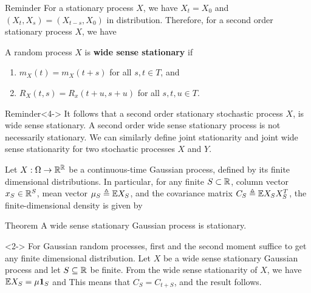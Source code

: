 \documentclass[12pt,aspectratio=169]{beamer}
\begin{document}
\begin{frame}
\begin{block}{Reminder}
For a stationary process $X$, we have $X_t = X_0$ and $(X_t,X_s) = (X_{t-s}, X_{0})$ in distribution. 
Therefore, for a second order stationary process $X$, we have 
\end{block}
\end{frame}

\begin{frame}
\begin{Definition}
A random process $X$ is \textbf{wide sense stationary} if 
\begin{enumerate}
\item<2-> $m_X(t) = m_X(t+s)$ for all $s,t \in T$, and 
\item<3-> $R_X(t,s) = R_x(t+u, s+u)$ for all $s,t,u \in T$. 
\end{enumerate} 
\end{Definition}
\begin{block}{Reminder}<4->
It follows that a second order stationary stochastic process $X$,  is wide sense stationary. 
A second order wide sense stationary process is not necessarily stationary. 
We can similarly define joint stationarity and joint wide sense stationarity for two stochastic processes $X$ and $Y$.
\end{block}
\end{frame}


\begin{frame}
\begin{Example} 
Let $X: \Omega \to \mathbb{R}^{\mathbb{R}}$ be a continuous-time Gaussian process, defined by its finite dimensional distributions. 
In particular, for any finite $S \subset \mathbb{R}$, column vector $x_S \in \mathbb{R}^S$,
mean vector $\mu_S \triangleq \mathbb{E} X_S$, 
and the covariance matrix $C_S \triangleq \mathbb{E} X_SX_S^T$, 
the finite-dimensional density is given by 
\end{Example}
\end{frame}


\begin{frame}
\begin{block}{Theorem} 
A wide sense stationary Gaussian process is stationary. 
\end{block}
\begin{Proof}<2->
For Gaussian random processes, first and the second moment suffice to get any finite dimensional distribution. 
Let $X$ be a wide sense stationary Gaussian process and let $S \subseteq \mathbb{R}$ be finite. 
From the wide sense stationarity of $X$, we have $\mathbb{E} X_S = \mu\mathbf{1}_S$ and 
This means that $C_S = C_{t+S}$, and the result follows.  
\end{Proof}
\end{frame}
\end{document}
